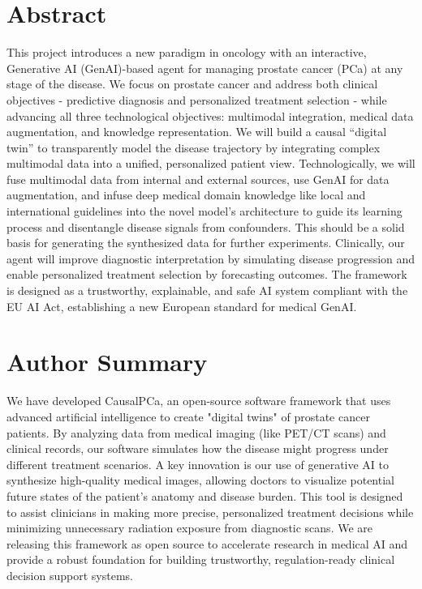 \documentclass[10pt,letterpaper]{article}
\begin{document}
\section*{Abstract}
This project introduces a new paradigm in oncology with an interactive, Generative AI (GenAI)-based agent for managing prostate cancer (PCa) at any stage of the disease. We focus on prostate cancer and address both clinical objectives - predictive diagnosis and personalized treatment selection - while advancing all three technological objectives: multimodal integration, medical data augmentation, and knowledge representation. We will build a causal ``digital twin'' to transparently model the disease trajectory by integrating complex multimodal data into a unified, personalized patient view. Technologically, we will fuse multimodal data from internal and external sources, use GenAI for data augmentation, and infuse deep medical domain knowledge like local and international guidelines into the novel model's architecture to guide its learning process and disentangle disease signals from confounders. This should be a solid basis for generating the synthesized data for further experiments. Clinically, our agent will improve diagnostic interpretation by simulating disease progression and enable personalized treatment selection by forecasting outcomes. The framework is designed as a trustworthy, explainable, and safe AI system compliant with the EU AI Act, establishing a new European standard for medical GenAI.

\section*{Author Summary}
We have developed CausalPCa, an open-source software framework that uses advanced artificial intelligence to create "digital twins" of prostate cancer patients. By analyzing data from medical imaging (like PET/CT scans) and clinical records, our software simulates how the disease might progress under different treatment scenarios. A key innovation is our use of generative AI to synthesize high-quality medical images, allowing doctors to visualize potential future states of the patient's anatomy and disease burden. This tool is designed to assist clinicians in making more precise, personalized treatment decisions while minimizing unnecessary radiation exposure from diagnostic scans. We are releasing this framework as open source to accelerate research in medical AI and provide a robust foundation for building trustworthy, regulation-ready clinical decision support systems.
\end{document}
